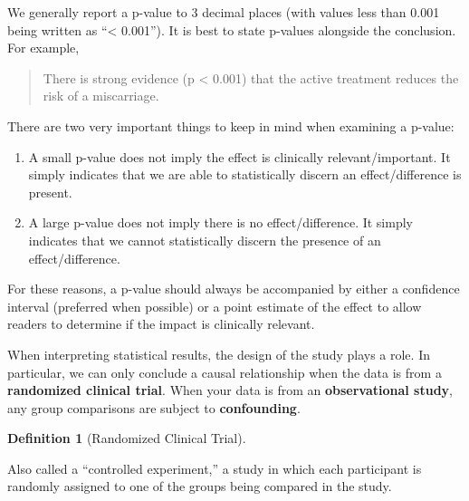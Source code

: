 \documentclass[
  letterpaper,
  DIV=11,
  numbers=noendperiod]{scrreprt}
\providecommand{\tightlist}{%
  \setlength{\itemsep}{0pt}\setlength{\parskip}{0pt}}\usepackage{longtable,booktabs,array}
\theoremstyle{definition}
\newtheorem{definition}{Definition}[chapter]
\theoremstyle{definition}
\theoremstyle{remark}
\begin{document}
We generally report a p-value to 3 decimal places (with values less than
0.001 being written as ``\textless{} 0.001''). It is best to state
p-values alongside the conclusion. For example,

\begin{quote}
There is strong evidence (p \textless{} 0.001) that the active treatment
reduces the risk of a miscarriage.
\end{quote}

\begin{tcolorbox}[enhanced jigsaw, left=2mm, toprule=.15mm, arc=.35mm, breakable, opacitybacktitle=0.6, opacityback=0, rightrule=.15mm, colbacktitle=quarto-callout-caution-color!10!white, coltitle=black, leftrule=.75mm, toptitle=1mm, colframe=quarto-callout-caution-color-frame, titlerule=0mm, title=\textcolor{quarto-callout-caution-color}{\faFire}\hspace{0.5em}{Caution}, bottomrule=.15mm, colback=white, bottomtitle=1mm]

There are two very important things to keep in mind when examining a
p-value:

\begin{enumerate}
\def\labelenumi{\arabic{enumi}.}
\tightlist
\item
  A small p-value does not imply the effect is clinically
  relevant/important. It simply indicates that we are able to
  statistically discern an effect/difference is present.
\item
  A large p-value does not imply there is no effect/difference. It
  simply indicates that we cannot statistically discern the presence of
  an effect/difference.
\end{enumerate}

\end{tcolorbox}

For these reasons, a p-value should always be accompanied by either a
confidence interval (preferred when possible) or a point estimate of the
effect to allow readers to determine if the impact is clinically
relevant.

When interpreting statistical results, the design of the study plays a
role. In particular, we can only conclude a causal relationship when the
data is from a \textbf{randomized clinical trial}. When your data is
from an \textbf{observational study}, any group comparisons are subject
to \textbf{confounding}.

\begin{definition}[Randomized Clinical
Trial]\protect\hypertarget{def-randomized-clinical-trial}{}\label{def-randomized-clinical-trial}

Also called a ``controlled experiment,'' a study in which each
participant is randomly assigned to one of the groups being compared in
the study.

\end{definition}
\end{document}
